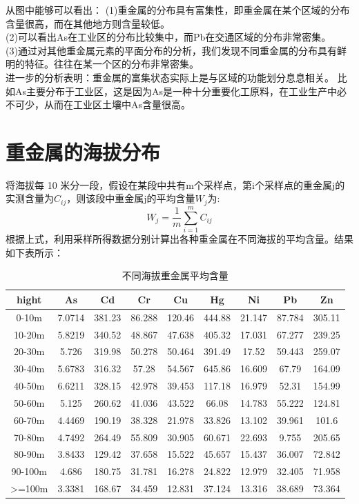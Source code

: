 \documentclass[a4paper]{article}
\begin{document}
从图中能够可以看出：
\indent (1)重金属的分布具有富集性，即重金属在某个区域的分布含量很高，而在其他地方则含量较低。 \\
\indent (2)可以看出As在工业区的分布比较集中，而Pb在交通区域的分布非常密集。                \\
\indent (3)通过对其他重金属元素的平面分布的分析，我们发现不同重金属的分布具有鲜明的特征。往往在某一个区的分布非常密集。 \\
进一步的分析表明：重金属的富集状态实际上是与区域的功能划分息息相关。
比如As主要分布于工业区，这是因为As是一种十分重要化工原料，在工业生产中必不可少，从而在工业区土壤中As含量很高。

\section{重金属的海拔分布}
将海拔每 10 米分一段，假设在某段中共有m个采样点，第i个采样点的重金属j的实测含量为$C_{ij}$，则该段中重金属j的平均含量$W_j$为:
\begin{equation}
W_j=\frac{1}{m}\sum_{i=1}^m C_{ij}
\end{equation}
根据上式，利用采样所得数据分别计算出各种重金属在不同海拔的平均含量。结果如下表所示：
\begin{table}[H]
		\centering
		\caption{不同海拔重金属平均含量}
		\label{average-contend}
		\begin{tabular}{c|cccccccc}
			hight	  &          	As	&   Cd   &     Cr     &   Cu   &     Hg  &    Ni   &     Pb    &   Zn  \\
			\hline
			 0-10m     	&	 7.0714  &  381.23  &  86.288  &  120.46 &   444.88 &   21.147 &   87.784  &  305.11     \\
    			10-20m     	&	 5.8219  &  340.52  &  48.867  &  47.638 &   405.32 &   17.031 &   67.277  &   239.25    \\
   			20-30m    	&	 5.726   &  319.98  &  50.278  &  50.464 &   391.49 &    17.52 &   59.443  &  259.07     \\
    			30-40m     	&	 5.6783  &  316.32  &   57.28  &  54.567 &   645.86 &   16.609 &    67.79  &  164.09     \\
    			40-50m     	&	 6.6211  &  328.15  &  42.978  &  39.453 &   117.18 &   16.979 &    52.31  &  154.99     \\
    			50-60m      	&	 5.125   & 260.62   & 41.036   & 43.522  &   66.08  &  14.783  &  55.222   & 124.81      \\
    			60-70m     	&	 4.4469  &  190.19  &  38.328  &  21.978 &   33.826 &   13.102 &   39.961  &   101.6     \\
    			70-80m     	&	 4.7492  &  264.49  &  55.809  &  30.905 &   60.671 &   22.693 &   9.755  &  205.65     \\
    			80-90m     	&	 3.8433  &  129.42  &  37.658  &  15.522 &   45.657 &   15.437 &   36.007  &  72.842     \\
    			90-100m    	&	 4.686   & 180.75   & 31.781   & 16.278  &  24.822  &  12.979  &  32.405   & 71.958      \\
    			>=100m    	&	 3.3381  &  168.67  &  34.459  &  12.831 &   37.124 &   13.316 &   38.689  &  73.364     \\
		\end{tabular}
	\end{table}
\end{document}
